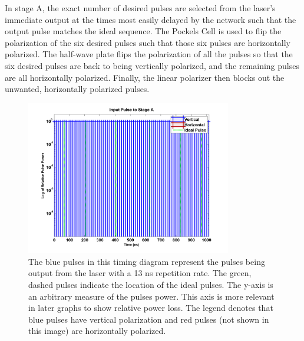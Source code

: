 \documentclass[pdftex,12pt,a4paper]{article}
\begin{document}
In stage A, the exact number of desired pulses are selected from the laser's immediate output at the times most easily delayed by the network such that the output pulse matches the ideal sequence. The Pockels Cell is used to flip the polarization of the six desired pulses such that those six pulses are horizontally polarized. The half-wave plate flips the polarization of all the pulses so that the six desired pulses are back to being vertically polarized, and the remaining pulses are all horizontally polarized. Finally, the linear polarizer then blocks out the unwanted, horizontally polarized pulses.

\begin{figure}[H]
\centering
\includegraphics[width=0.8\textwidth]{input_pulse.png} \caption{The blue pulses in this timing diagram represent the pulses being output from the laser with a 13 ns repetition rate. The green, dashed pulses indicate the location of the ideal pulses. The y-axis is an arbitrary measure of the pulses power. This axis is more relevant in later graphs to show relative power loss. The legend denotes that blue pulses have vertical polarization and red pulses (not shown in this image) are horizontally polarized.}
\label{fig:timing_input_train}
\end{figure}
\end{document}
